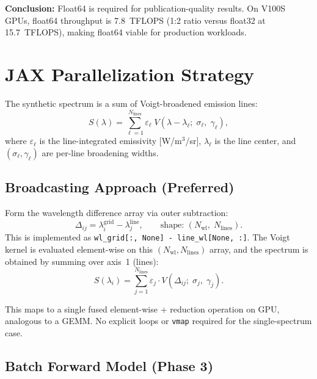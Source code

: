 \documentclass[11pt]{article}
\begin{document}
\textbf{Conclusion:} Float64 is required for publication-quality results.
On V100S GPUs, float64 throughput is 7.8~TFLOPS (1:2 ratio versus float32 at 15.7~TFLOPS),
making float64 viable for production workloads.


\section{JAX Parallelization Strategy}
\label{sec:jax}

The synthetic spectrum is a sum of Voigt-broadened emission lines:
\begin{equation}
  S(\lambda) = \sum_{\ell=1}^{N_{\text{lines}}} \varepsilon_\ell\;
    V\!\left(\lambda - \lambda_\ell;\;\sigma_\ell,\;\gamma_\ell\right),
  \label{eq:spectrum_sum}
\end{equation}
where $\varepsilon_\ell$ is the line-integrated emissivity [W/m$^3$/sr],
$\lambda_\ell$ is the line center, and $(\sigma_\ell, \gamma_\ell)$ are
per-line broadening widths.

\subsection{Broadcasting Approach (Preferred)}

Form the wavelength difference array via outer subtraction:
\begin{equation}
  \Delta_{ij} = \lambda_i^{\text{grid}} - \lambda_j^{\text{line}},
  \qquad \text{shape: } (N_{\text{wl}},\; N_{\text{lines}}).
  \label{eq:diff_array}
\end{equation}
This is implemented as \texttt{wl\_grid[:, None] - line\_wl[None, :]}.
The Voigt kernel is evaluated element-wise on this $(N_{\text{wl}}, N_{\text{lines}})$
array, and the spectrum is obtained by summing over axis~1 (lines):
\begin{equation}
  S(\lambda_i) = \sum_{j=1}^{N_{\text{lines}}} \varepsilon_j \cdot
    V(\Delta_{ij};\;\sigma_j,\;\gamma_j).
  \label{eq:broadcast_sum}
\end{equation}

This maps to a single fused element-wise + reduction operation on GPU,
analogous to a GEMM. No explicit loops or \texttt{vmap} required for
the single-spectrum case.

\subsection{Batch Forward Model (Phase 3)}
\end{document}
